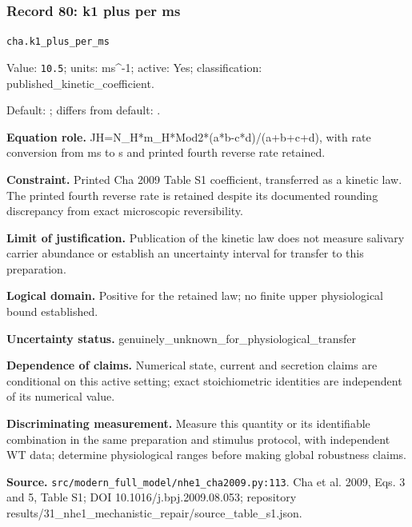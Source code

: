 \subsubsection*{Record 80: k1 plus per ms}
{\small \nolinkurl{cha.k1_plus_per_ms}\par

Value: \texttt{10.5}; units: ms\textasciicircum{}-1; active: Yes; classification: published\_kinetic\_coefficient.\par

Default: ; differs from default: .\par

\textbf{Equation role.} JH=N\_H*m\_H*Mod2*(a*b-c*d)/(a+b+c+d), with rate conversion from ms to s and printed fourth reverse rate retained.\par

\textbf{Constraint.} Printed Cha 2009 Table S1 coefficient, transferred as a kinetic law. The printed fourth reverse rate is retained despite its documented rounding discrepancy from exact microscopic reversibility.\par

\textbf{Limit of justification.} Publication of the kinetic law does not measure salivary carrier abundance or establish an uncertainty interval for transfer to this preparation.\par

\textbf{Logical domain.} Positive for the retained law; no finite upper physiological bound established.\par

\textbf{Uncertainty status.} genuinely\_unknown\_for\_physiological\_transfer\par

\textbf{Dependence of claims.} Numerical state, current and secretion claims are conditional on this active setting; exact stoichiometric identities are independent of its numerical value.\par

\textbf{Discriminating measurement.} Measure this quantity or its identifiable combination in the same preparation and stimulus protocol, with independent WT data; determine physiological ranges before making global robustness claims.\par

\textbf{Source.} \nolinkurl{src/modern_full_model/nhe1_cha2009.py:113}. Cha et al. 2009, Eqs. 3 and 5, Table S1; DOI 10.1016/j.bpj.2009.08.053; repository results/31\_nhe1\_mechanistic\_repair/source\_table\_s1.json.\par}

